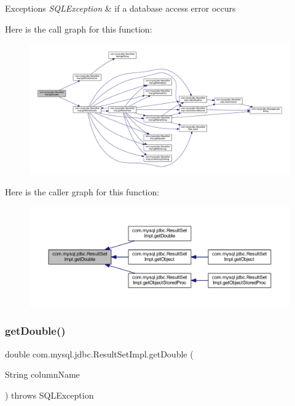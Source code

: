 \begin{DoxyExceptions}{Exceptions}
{\em S\+Q\+L\+Exception} & if a database access error occurs \\
\hline
\end{DoxyExceptions}
Here is the call graph for this function\+:
\nopagebreak
\begin{figure}[H]
\begin{center}
\leavevmode
\includegraphics[width=350pt]{classcom_1_1mysql_1_1jdbc_1_1_result_set_impl_a87d7b2fe049365eabfe54dc800b68ec0_cgraph}
\end{center}
\end{figure}
Here is the caller graph for this function\+:
\nopagebreak
\begin{figure}[H]
\begin{center}
\leavevmode
\includegraphics[width=350pt]{classcom_1_1mysql_1_1jdbc_1_1_result_set_impl_a87d7b2fe049365eabfe54dc800b68ec0_icgraph}
\end{center}
\end{figure}
\mbox{\label{classcom_1_1mysql_1_1jdbc_1_1_result_set_impl_a301509f3aef1860590c3e7ee656d5142}} 
\subsubsection{\texorpdfstring{get\+Double()}{getDouble()}\hspace{0.1cm}{\footnotesize\ttfamily [2/2]}}
{\footnotesize\ttfamily double com.\+mysql.\+jdbc.\+Result\+Set\+Impl.\+get\+Double (\begin{DoxyParamCaption}\item[{String}]{column\+Name }\end{DoxyParamCaption}) throws S\+Q\+L\+Exception}


